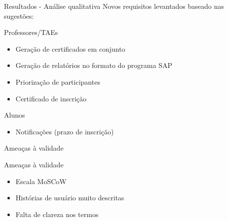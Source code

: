 \begin{frame}{{\sffamily Resultados - Análise qualitativa}}
  Novos requisitos levantados baseado nas sugestões:
  \begin{block}{Professores/TAEs}
    \begin{itemize}
      \item Geração de certificados em conjunto
      \item Geração de relatórios no formato do programa SAP
      \item Priorização de participantes
      \item Certificado de inscrição
    \end{itemize}
  \end{block}
  \begin{block}{Alunos}
    \begin{itemize}
      \item Notificações (prazo de inscrição)
    \end{itemize}
  \end{block}
\end{frame}

\begin{frame}{{\sffamily Ameaças à validade}}
  \begin{block}{Ameaças à validade}
    \begin{itemize}
      \item Escala MoSCoW
      \item Histórias de usuário muito descritas
      \item Falta de clareza nos termos
    \end{itemize}
  \end{block}
\end{frame}